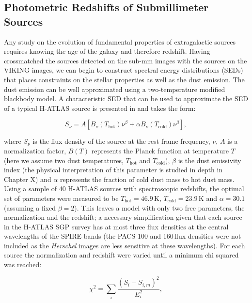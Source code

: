 \subsection{Photometric Redshifts of Submillimeter Sources}
\label{sec:phot_z_Herschel}

Any study on the evolution of fundamental properties of extragalactic sources requires knowing the age of the galaxy and therefore redshift. Having crossmatched the sources detected on the sub-mm images with the sources on the VIKING images, we can begin to construct spectral energy distributions (SEDs) that places constraints on the stellar properties as well as the dust emission. The dust emission can be well approximated using a two-temperature modified blackbody model. A characteristic SED that can be used to approximate the SED of a typical H-ATLAS source is presented in \citealt{Pearson_2013} and takes the form:

\begin{equation}
    S_\nu = A[B_\nu(T_{\textrm{hot}})\nu^\beta + \alpha B_\nu(T_{\textrm{cold}})\nu^\beta],
\label{eq:pearson_sed_model}
\end{equation}

where $S_\nu$ is the flux density of the source at the rest frame frequency, $\nu$, $A$ is a normalization factor, $B(T)$ represents the Planck function at temperature $T$ (here we assume two dust temperatures, $T_{\textrm{hot}}$ and $T_{\textrm{cold}}$), $\beta$ is the dust emissivity index (the physical interpretation of this parameter is studied in depth in Chapter {\color{red} X}) and $\alpha$ represents the fraction of cold dust mass to hot dust mass. Using a sample of 40 H-ATLAS sources with spectroscopic redshifts, the optimal set of parameters were measured to be $T_{\textrm{hot}} = 46.9$\,K, $T_{\textrm{cold}} = 23.9$\,K and $\alpha = 30.1$ (assuming a fixed $\beta = 2$). This leaves a model with only two free parameters, the normalization and the redshift; a necessary simplification given that each source in the H-ATLAS SGP survey has at most three flux densities at the central wavelengths of the SPIRE bands (the PACS 100 and 160\,\micron flux densities were not included as the \textit{Herschel} images are less sensitive at these wavelengths). For each source the normalization and redshift were varied until a minimum chi squared was reached:

\begin{equation}
    \chi^2 = \sum_i \frac{(S_i - S_{i,m})^2}{E_i^2},
\end{equation}

